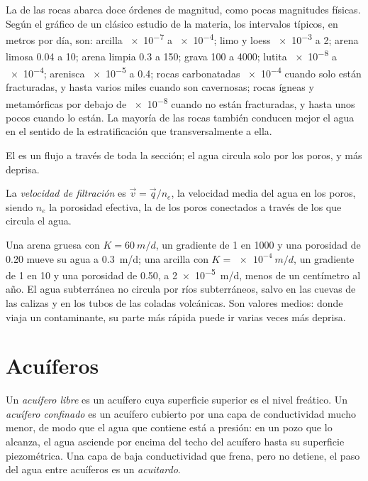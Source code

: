 La  de las rocas abarca doce órdenes de
magnitud, como pocas magnitudes físicas. Según el gráfico de un clásico
estudio de la materia, los intervalos típicos, en metros por día, son: arcilla
\num{e-7} a \num{e-4}; limo y loess \num{e-3} a 2; arena limosa 0.04 a
10; arena limpia 0.3 a 150; grava 100 a 4000; lutita \num{e-8} a
\num{e-4}; arenisca \num{e-5} a 0.4; rocas carbonatadas \num{e-4} cuando
solo están fracturadas, y hasta varios miles cuando son cavernosas; rocas ígneas y
metamórficas por debajo de \num{e-8} cuando no están fracturadas, y hasta unos pocos cuando
lo están. La mayoría de las rocas también conducen mejor el agua en el sentido de la estratificación que
transversalmente a ella.

El  es un flujo a través de toda la sección; el agua circula
solo por los poros, y más deprisa.

\begin{definition}\label{def:b3:hydrogeology:seepage}
La \emph{velocidad de filtración} es $\vec v = \vec
q/n_e$, la velocidad media del agua en los poros, siendo $n_e$ la
porosidad efectiva, la de los poros conectados a través de los que circula el
agua.
\end{definition}

Una arena gruesa con $K = \qty{60}{m/d}$, un gradiente de 1 en 1000 y una
porosidad de 0.20 mueve su agua a \qty{0.3}{m/d}; una arcilla con $K =
\qty{e-4}{m/d}$, un gradiente de 1 en 10 y una porosidad de 0.50, a
\qty{2e-5}{m/d}, menos de un centímetro al año. El agua subterránea no circula
por ríos subterráneos, salvo en las cuevas de las calizas y en los tubos de las
coladas volcánicas. Son valores medios: donde viaja un contaminante, su parte más rápida puede
ir varias veces más deprisa.

\section{Acuíferos}\label{sec:b3:hydrogeology:aquifers}

\begin{definition}\label{def:b3:hydrogeology:aquifer-types}
Un \emph{acuífero libre} es un acuífero cuya
superficie superior es el nivel freático. Un \emph{acuífero
confinado} es un acuífero cubierto por una capa de conductividad mucho
menor, de modo que el agua que contiene está a presión: en un pozo que lo alcanza,
el agua asciende por encima del techo del acuífero hasta su superficie
piezométrica. Una capa de baja conductividad que frena, pero no detiene, el paso del agua
entre acuíferos es un
\emph{acuitardo}.
\end{definition}

